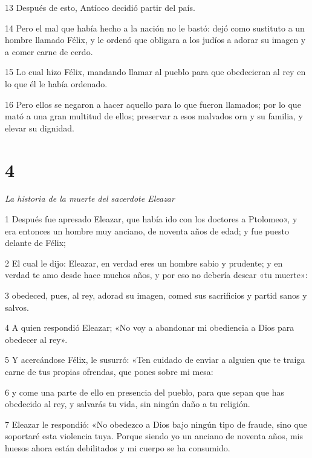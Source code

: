 \par 13 Después de esto, Antíoco decidió partir del país.

\par 14 Pero el mal que había hecho a la nación no le bastó: dejó como sustituto a un hombre llamado Félix, y le ordenó que obligara a los judíos a adorar su imagen y a comer carne de cerdo.

\par 15 Lo cual hizo Félix, mandando llamar al pueblo para que obedecieran al rey en lo que él le había ordenado.

\par 16 Pero ellos se negaron a hacer aquello para lo que fueron llamados; por lo que mató a una gran multitud de ellos; preservar a esos malvados orn y su familia, y elevar su dignidad.

\chapter{4}

\par \textit{La historia de la muerte del sacerdote Eleazar}

\par 1 Después fue apresado Eleazar, que había ido con los doctores a Ptolomeo», y era entonces un hombre muy anciano, de noventa años de edad; y fue puesto delante de Félix;

\par 2 El cual le dijo: Eleazar, en verdad eres un hombre sabio y prudente; y en verdad te amo desde hace muchos años, y por eso no debería desear «tu muerte»:

\par 3 obedeced, pues, al rey, adorad su imagen, comed sus sacrificios y partid sanos y salvos.

\par 4 A quien respondió Eleazar; «No voy a abandonar mi obediencia a Dios para obedecer al rey».

\par 5 Y acercándose Félix, le susurró: «Ten cuidado de enviar a alguien que te traiga carne de tus propias ofrendas, que pones sobre mi mesa:

\par 6 y come una parte de ello en presencia del pueblo, para que sepan que has obedecido al rey, y salvarás tu vida, sin ningún daño a tu religión.

\par 7 Eleazar le respondió: «No obedezco a Dios bajo ningún tipo de fraude, sino que soportaré esta violencia tuya. Porque siendo yo un anciano de noventa años, mis huesos ahora están debilitados y mi cuerpo se ha consumido.

